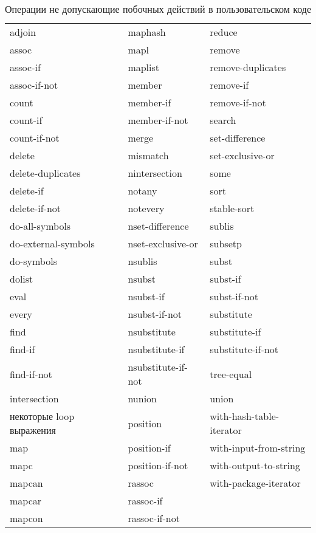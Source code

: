 \begin{table}[t]
\leavevmode
\caption{Операции не допускающие побочных действий в пользовательском коде}
\label{TRAVERSAL-OPERATIONS-TABLE}

\begingroup\cf {}\relax
\begin{tabular*}{\textwidth}{@{}l@{\extracolsep{\fill}}ll@{}}
adjoin & maphash & reduce \\
assoc & mapl & remove \\
assoc-if & maplist & remove-duplicates \\
assoc-if-not & member & remove-if \\
count & member-if & remove-if-not \\
count-if & member-if-not & search \\
count-if-not & merge & set-difference \\
delete & mismatch & set-exclusive-or \\
delete-duplicates & nintersection & some \\
delete-if & notany & sort \\
delete-if-not & notevery & stable-sort \\
do-all-symbols & nset-difference & sublis \\
do-external-symbols & nset-exclusive-or & subsetp \\
do-symbols & nsublis & subst \\
dolist & nsubst & subst-if \\
eval & nsubst-if & subst-if-not \\
every & nsubst-if-not & substitute \\
find & nsubstitute & substitute-if \\
find-if & nsubstitute-if & substitute-if-not \\
find-if-not & nsubstitute-if-not & tree-equal \\
intersection & nunion & union \\
\textrm{некоторые} loop \textrm{выражения} & position & with-hash-table-iterator \\
map & position-if & with-input-from-string \\
mapc & position-if-not & with-output-to-string \\
mapcan & rassoc & with-package-iterator \\
mapcar & rassoc-if \\
mapcon & rassoc-if-not
\end{tabular*}
\endgroup
\end{table}

